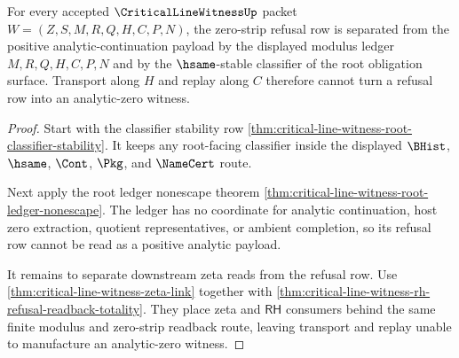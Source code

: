 \begin{theorem}
\label{thm:critical-line-witness-zero-strip-modulus-separation}
For every accepted $\CriticalLineWitnessUp$ packet
$W=(Z,S,M,R,Q,H,C,P,N)$, the zero-strip refusal row is separated from the
positive analytic-continuation payload by the displayed modulus ledger
$M,R,Q,H,C,P,N$ and by the $\hsame$-stable classifier of the root obligation
surface. Transport along $H$ and replay along $C$ therefore cannot turn a
refusal row into an analytic-zero witness.
\end{theorem}
\begin{proof}
Start with the classifier stability row
\autoref{thm:critical-line-witness-root-classifier-stability}. It keeps any
root-facing classifier inside the displayed $\BHist$, $\hsame$, $\Cont$,
$\Pkg$, and $\NameCert$ route.

Next apply the root ledger nonescape theorem
\autoref{thm:critical-line-witness-root-ledger-nonescape}. The ledger has no
coordinate for analytic continuation, host zero extraction, quotient
representatives, or ambient completion, so its refusal row cannot be read as
a positive analytic payload.

It remains to separate downstream zeta reads from the refusal row. Use
\autoref{thm:critical-line-witness-zeta-link} together with
\autoref{thm:critical-line-witness-rh-refusal-readback-totality}. They place
zeta and $\mathsf{RH}$ consumers behind the same finite modulus and
zero-strip readback route, leaving transport and replay unable to manufacture
an analytic-zero witness.
\end{proof}

